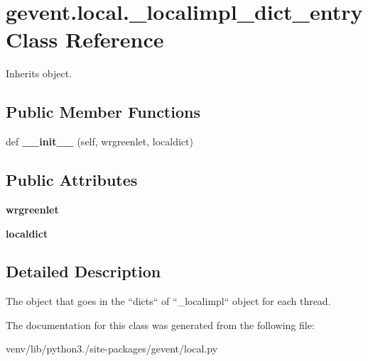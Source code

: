 \hypertarget{classgevent_1_1local_1_1__localimpl__dict__entry}{}\section{gevent.\+local.\+\_\+localimpl\+\_\+dict\+\_\+entry Class Reference}
\label{classgevent_1_1local_1_1__localimpl__dict__entry}


Inherits object.

\subsection*{Public Member Functions}
\begin{DoxyCompactItemize}
\item 
\mbox{\label{classgevent_1_1local_1_1__localimpl__dict__entry_a6c644fbf3443094b87a56db8ecd05b86}} 
def {\bfseries \+\_\+\+\_\+init\+\_\+\+\_\+} (self, wrgreenlet, localdict)
\end{DoxyCompactItemize}
\subsection*{Public Attributes}
\begin{DoxyCompactItemize}
\item 
\mbox{\label{classgevent_1_1local_1_1__localimpl__dict__entry_aec1d957a2bc272a61d70278e37453819}} 
{\bfseries wrgreenlet}
\item 
\mbox{\label{classgevent_1_1local_1_1__localimpl__dict__entry_acf3eaa18acfeb0c1fde23a0cfb19534b}} 
{\bfseries localdict}
\end{DoxyCompactItemize}


\subsection{Detailed Description}
\begin{DoxyVerb}The object that goes in the ``dicts`` of ``_localimpl``
object for each thread.
\end{DoxyVerb}
 

The documentation for this class was generated from the following file\+:\begin{DoxyCompactItemize}
\item 
venv/lib/python3./site-\/packages/gevent/local.\+py\end{DoxyCompactItemize}
